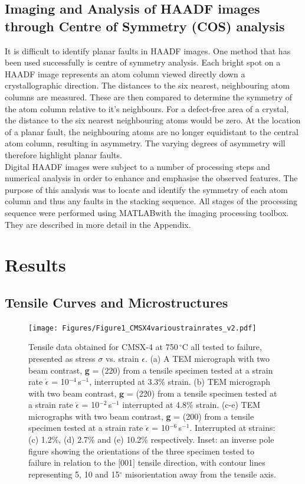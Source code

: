 \documentclass[a4paper,12pt,times,numbered,print,index]{Classes/PhDThesisPSnPDF}
\begin{document}
\subsection*{Imaging and Analysis of HAADF images through Centre of Symmetry (COS) analysis}\label{section:COS}
It is difficult to identify planar faults in HAADF images. One method that has been used successfully is centre of symmetry analysis. Each bright spot on a HAADF image represents an atom column viewed directly down a crystallographic direction. The distances to the six nearest, neighbouring atom columns are measured. These are then compared to determine the symmetry of the atom column relative to it's neighbours. For a defect-free area of a crystal, the distance to the six nearest neighbouring atoms would be zero. At the location of a planar fault, the neighbouring atoms are no longer equidistant to the central atom column, resulting in asymmetry. The varying degrees of asymmetry will therefore highlight planar faults.\\
Digital HAADF images were subject to a number of processing steps and numerical analysis in order to enhance and emphasise the observed features. The purpose of this analysis was to locate and identify the symmetry of each atom column and thus any faults in the stacking sequence. All stages of the processing sequence were performed using MATLAB\textregistered with the imaging processing toolbox. They are described in more detail in the Appendix.


\section*{Results}
\subsection*{Tensile Curves and Microstructures}
\begin{figure}
\texttt{[image: Figures/Figure1\_CMSX4varioustrainrates\_v2.pdf]}
\caption{Tensile data obtained for CMSX-4 at 750\,$^\circ$C all tested to failure, presented as stress $\sigma$ vs. strain $\epsilon$. (a) A TEM micrograph with two beam contrast, \textbf{g} = (220) from a tensile specimen tested at a strain rate $\dot{\epsilon}$ = 10$^{-4}$\,s$^{-1}$, interrupted at 3.3\% strain. (b) TEM micrograph with two beam contrast, $\textbf{g}$ = (220) from a tensile specimen tested at a strain rate $\dot{\epsilon}$ = 10$^{-2}$\,s$^{-1}$ interrupted at 4.8\% strain. (c-e) TEM micrographs with two beam contrast, \textbf{g} = (200) from a tensile specimen tested at a strain rate $\dot{\epsilon}$ = 10$^{-6}$\,s$^{-1}$. Interrupted at strains:  (c) 1.2\%, (d) 2.7\% and (e) 10.2\% respectively. Inset: an inverse pole figure showing the orientations of the three specimen tested to failure in relation to the $[$001$]$ tensile direction, with contour lines representing 5, 10 and 15$^\circ$ misorientation away from the tensile axis.}
\label{fig:x4_stressstrain}
\end{figure}
\end{document}
